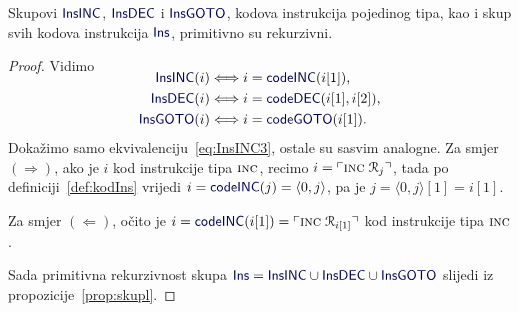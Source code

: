 \begin{lema}[{name=[primitivna rekurzivnost slike kodiranja RAM-instrukcija]}]\label{lm:InsTYPEprn}
    Skupovi $\f{InsINC}$, $\f{InsDEC}$ i $\f{InsGOTO}$, kodova instrukcija pojedinog tipa, kao i skup svih kodova instrukcija $\f{Ins}$, primitivno su rekurzivni.
\end{lema}
\begin{proof}
Vidimo
\begin{align}
\SwapAboveDisplaySkip
    \label{eq:InsINC3}\f{InsINC}(i)&\Longleftrightarrow i\eq\f{codeINC}(i[1])\text,\\
    \label{eq:InsDEC3}\f{InsDEC}(i)&\Longleftrightarrow i\eq\f{codeDEC}(i[1],i[2])\text,\\
    \label{eq:InsGOTO3}\f{InsGOTO}(i)&\Longleftrightarrow i\eq\f{codeGOTO}(i[1])\text.
\end{align}
    Dokažimo samo ekvivalenciju~\eqref{eq:InsINC3}, ostale su sasvim analogne. Za smjer $(\Rightarrow)$, ako je $i$ kod instrukcije tipa $\textsc{inc}$, recimo $i=\ulcorner\textsc{inc}\;\mathcal R_{j}\urcorner$, tada po definiciji~\ref{def:kodIns} vrijedi $i=\f{codeINC}(j)=\langle0,j\rangle$, pa je $j=\langle0,j\rangle[1]=i[1]$.%

    Za smjer $(\Leftarrow)$, očito je $i=\f{codeINC}(i[1])=\kins{\incr{i[1]}}$ kod instrukcije tipa $\textsc{inc}$.

    Sada primitivna rekurzivnost skupa $\f{Ins}=\f{InsINC}\cup\f{InsDEC}\cup\f{InsGOTO}$ slijedi iz propozicije~\ref{prop:skupl}.
\end{proof}


